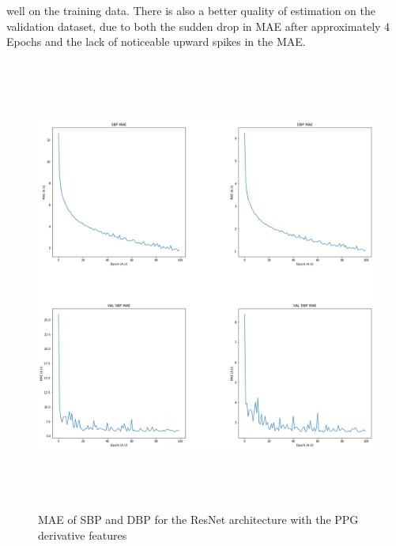 well on the training data. There is also a better quality of estimation on the validation dataset, due to both the sudden drop in MAE after approximately 
4 Epochs and the lack of noticeable upward spikes in the MAE.
\begin{figure}[H]
    \centering
    \includegraphics[width=15cm,height=15cm,keepaspectratio]{Results/resnetDeriv.png}
    \caption{MAE of SBP and DBP for the ResNet architecture with the PPG derivative features}
    \label{resnetDerivResults}
\end{figure}

